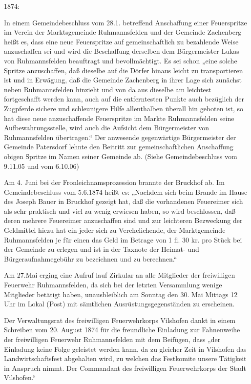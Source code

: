 \documentclass[12pt,a4paper]{book}
\begin{document}
1874:

In einem Gemeindebeschluss vom 28.1. betreffend Anschaffung einer Feuerspritze
im Verein der Marktsgemeinde Ruhmannsfelden und der Gemeinde Zachenberg heißt
es, dass eine neue Feuerspritze auf gemeinschaftlich zu bezahlende Weise
anzuschaffen sei und wird die Beschaffung derselben dem Bürgermeister Lukas von
Ruhmannsfelden beauftragt und bevollmächtigt. Es sei schon „eine solche Spritze
anzuschaffen, daß dieselbe auf die Dörfer hinaus leicht zu transportieren ist
und in Erwägung, daß die Gemeinde Zachenberg in ihrer Lage sich zunächst neben
Ruhmannsfelden hinzieht und von da aus dieselbe am leichtest fortgeschafft
werden kann, auch auf die entferntesten Punkte auch bezüglich der Zugpferde
sichere und schleunigere Hilfe allenthalben überall hin geboten ist, so hat
diese neue anzuschaffende Feuerspritze im Markte Ruhmannsfelden seine
Aufbewahrungsstelle, wird auch die Aufsicht dem Bürgermeister von Ruhmannsfelden
übertragen.“ Der anwesende gegenwärtige Bürgermeister der Gemeinde Patersdorf
lehnte den Beitritt zur gemeinschaftlichen Anschaffung obigen Spritze im Namen
seiner Gemeinde ab. (Siehe Gemeindebeschluss vom 9.11.05 und vom 6.10.06)

Am 4. Juni bei der Fronleichnamsprozession brannte der Bruckhof ab. Im
Gemeindebeschluss vom 5.6.1874 heißt es: „Nachdem sich beim Brande im Hause des
Joseph Bauer in Bruckhof gezeigt hat, daß die vorhandenen Feuereimer sich als
sehr praktisch und viel zu wenig erwiesen haben, so wird beschlossen, daß deren
mehrere Feuereimer anzuschaffen sind und zur leichteren Bezweckung der
Geldmittel hiezu hat ein jeder sich zu Verehelichende, der Marktgemeinde
Ruhmannsfelden je für einen das Geld im Betrage von 1 fl. 30 kr. pro Stück bei
der Gemeinde zu erlegen und ist in der Taxnote der Heimat- und
Bürgeraufnahmegebühr zu bezeichnen und zu berechnen.“

Am 27.Mai erging eine Aufruf lauf Zirkular an alle Mitglieder der freiwilligen
Feuerwehr Ruhmannsfelden, da sich bei der letzten Versammlung wenige Mitglieder
betätigt haben, unausbleiblich am Sonntag den 30. Mai Mittags 12 Uhr im Lokal
(Post) mit sämtlichen Ausrüstungsgegenständen zu erscheinen.

Der Verwaltungsrat des freiwilligen Feuerwehrkorps Vilshofen dankt in einem
Schreiben vom 20. August 1874 für die freundliche Einladung zur Fahnenweihe der
freiwilligen Feuerwehr Ruhmannsfelden mit dem Beifügen, dass „der Einladung
keine Folge geleistet werden kann, da zu gleicher Zeit in Vilshofen das
Landwirtschaftsfest abgehalten wird, zu welchen das Festkomite unsere Tätigkeit
in Anspruch nimmt. Der Commandant des freiwilligen Feuerwehrkorps der Stadt
Vilshofen.“
\end{document}
